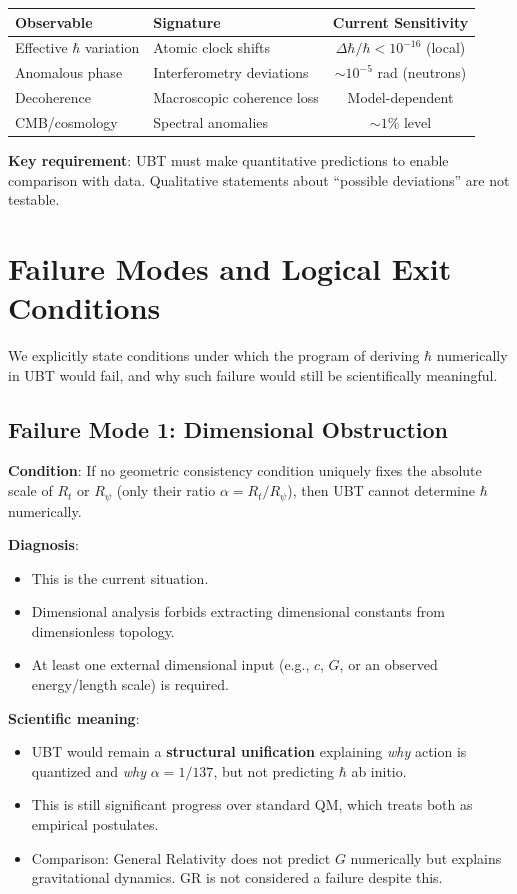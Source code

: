 \documentclass[12pt]{article}
\begin{document}
\begin{center}
\begin{tabular}{|l|l|c|}
\hline
\textbf{Observable} & \textbf{Signature} & \textbf{Current Sensitivity} \\
\hline
Effective $\hbar$ variation & Atomic clock shifts & $\Delta \hbar/\hbar < 10^{-16}$ (local) \\
Anomalous phase & Interferometry deviations & $\sim 10^{-5}$ rad (neutrons) \\
Decoherence & Macroscopic coherence loss & Model-dependent \\
CMB/cosmology & Spectral anomalies & $\sim 1\%$ level \\
\hline
\end{tabular}
\end{center}

\textbf{Key requirement}: UBT must make quantitative predictions to enable comparison with data. Qualitative statements about ``possible deviations'' are not testable.

\section{Failure Modes and Logical Exit Conditions}

We explicitly state conditions under which the program of deriving $\hbar$ numerically in UBT would fail, and why such failure would still be scientifically meaningful.

\subsection{Failure Mode 1: Dimensional Obstruction}

\textbf{Condition}: If no geometric consistency condition uniquely fixes the absolute scale of $R_t$ or $R_\psi$ (only their ratio $\alpha = R_t/R_\psi$), then UBT cannot determine $\hbar$ numerically.

\textbf{Diagnosis}:
\begin{itemize}
\item This is the current situation.
\item Dimensional analysis forbids extracting dimensional constants from dimensionless topology.
\item At least one external dimensional input (e.g., $c$, $G$, or an observed energy/length scale) is required.
\end{itemize}

\textbf{Scientific meaning}:
\begin{itemize}
\item UBT would remain a \textbf{structural unification} explaining \emph{why} action is quantized and \emph{why} $\alpha = 1/137$, but not predicting $\hbar$ ab initio.
\item This is still significant progress over standard QM, which treats both as empirical postulates.
\item Comparison: General Relativity does not predict $G$ numerically but explains gravitational dynamics. GR is not considered a failure despite this.
\end{itemize}
\end{document}
